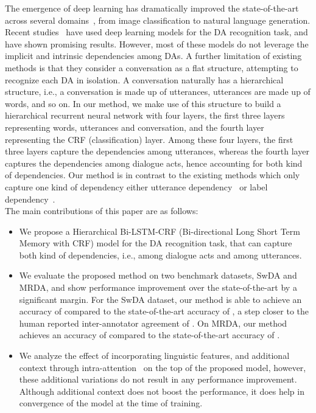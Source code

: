 \documentclass[letterpaper]{article} \usepackage{aaai18}
\begin{document}
The emergence of deep learning has dramatically improved the state-of-the-art across several domains~\cite{Lecun2015}, from image classification to natural language generation. Recent studies~\cite{Blunsom2013,Lee2016,Khanpour2016,Ji2016} have used deep learning models for the DA recognition task, and have shown promising results. However, most of these models do not leverage the implicit and intrinsic dependencies among DAs. A further limitation of existing methods is that they consider a conversation as a flat structure, attempting to recognize each DA in isolation. A conversation naturally has a hierarchical structure, i.e., a conversation is made up of utterances, utterances are made up of words, and so on. In our method, we make use of this structure to build a hierarchical recurrent neural network with four layers, the first three layers representing words, utterances and conversation, and the fourth layer representing the CRF (classification) layer. Among these four layers, the first three layers capture the dependencies among utterances, whereas the fourth layer captures the dependencies among dialogue acts, hence accounting for both kind of dependencies. Our method is in contrast to the existing methods which only capture one kind of dependency either utterance dependency~\cite{Blunsom2013} or label dependency~\cite{Huang2015,Ma2016}.\\ 
The main contributions of this paper are as follows:
\begin{itemize}
\item We propose a Hierarchical Bi-LSTM-CRF (Bi-directional Long Short Term Memory with CRF) model for the DA recognition task, that can capture both kind of dependencies, i.e., among dialogue acts and among utterances.
\item We evaluate the proposed method on two benchmark datasets, SwDA and MRDA, and show performance improvement over the state-of-the-art by a significant margin. For the SwDA dataset, our method is able to achieve an accuracy of  compared to the state-of-the-art accuracy of , a step closer to the human reported inter-annotator agreement of . On MRDA, our method achieves an accuracy of  compared to the state-of-the-art accuracy of .
\item We analyze the effect of incorporating linguistic features, and additional context through intra-attention~\cite{paulus2017deep} on the top of the proposed model, however, these additional variations do not result in any performance improvement. Although additional context does not boost the performance, it does help in convergence of the model at the time of training. 
\end{itemize}
\end{document}
